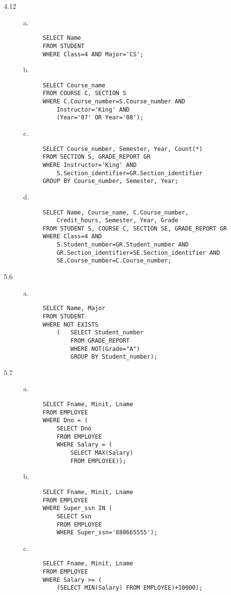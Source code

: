 \documentclass[12pt,a4paper,oneside]{report}
\begin{document}
\begin{description}
	\item[4.12]
	\begin{description}
		\item[a.]\hfill
		\begin{lstlisting}
SELECT Name
FROM STUDENT
WHERE Class=4 AND Major='CS';
		\end{lstlisting}
		\item[b.]\hfill
		\begin{lstlisting}
SELECT Course_name
FROM COURSE C, SECTION S
WHERE C.Course_number=S.Course_number AND
	Instructor='King' AND 
	(Year='07' OR Year='08');		
		\end{lstlisting}
		\item[c.]\hfill
		\begin{lstlisting}
SELECT Course_number, Semester, Year, Count(*) 
FROM SECTION S, GRADE_REPORT GR
WHERE Instructor='King' AND
	S.Section_identifier=GR.Section_identifier
GROUP BY Course_number, Semester, Year;
		\end{lstlisting}
		\item[d.]\hfill
		\begin{lstlisting}
SELECT Name, Course_name, C.Course_number, 
	Credit_hours, Semester, Year, Grade
FROM STUDENT S, COURSE C, SECTION SE, GRADE_REPORT GR
WHERE Class=4 AND 
	S.Student_number=GR.Student_number AND
	GR.Section_identifier=SE.Section_identifier AND
	SE.Course_number=C.Course_number;	
		\end{lstlisting}
	\end{description}
\end{description}
\begin{description}
	\item[5.6]
	\begin{description}
		\item[a.]\hfill
		\begin{lstlisting}
SELECT Name, Major
FROM STUDENT
WHERE NOT EXISTS 
	(	SELECT Student_number
		FROM GRADE_REPORT
		WHERE NOT(Grade="A")
		GROUP BY Student_number);
		\end{lstlisting}
	\end{description}
	\item[5.7]
	\begin{description}
		\item[a.]\hfill
		\begin{lstlisting}
SELECT Fname, Minit, Lname
FROM EMPLOYEE
WHERE Dno = (
	SELECT Dno
	FROM EMPLOYEE
	WHERE Salary = (
		SELECT MAX(Salary)
		FROM EMPLOYEE));
		\end{lstlisting}
		\item[b.]\hfill
		\begin{lstlisting}
SELECT Fname, Minit, Lname
FROM EMPLOYEE
WHERE Super_ssn IN (
	SELECT Ssn
	FROM EMPLOYEE
	WHERE Super_ssn='888665555');
		\end{lstlisting}
		\item[c.]\hfill
		\begin{lstlisting}
SELECT Fname, Minit, Lname
FROM EMPLOYEE
WHERE Salary >= (
	(SELECT MIN(Salary) FROM EMPLOYEE)+10000);	
		\end{lstlisting}
	\end{description}
\end{description}
\end{document}
